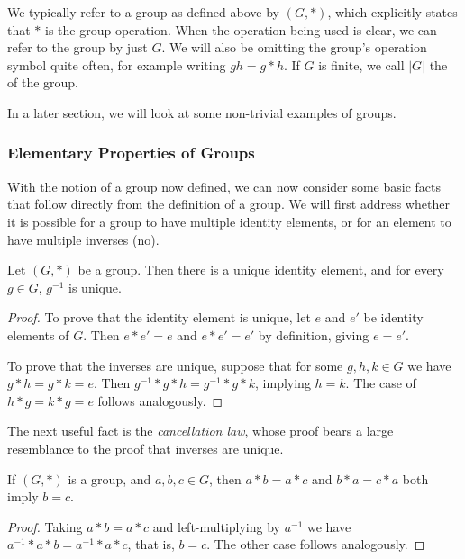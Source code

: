 \documentclass[a4paper]{scrartcl}
\begin{document}
We typically refer to a group as defined above by $(G, *)$, which explicitly states that $*$ is the group operation. When the operation being used is clear, we can refer to the group by just $G$. We will also be omitting the group's operation symbol quite often, for example writing $gh = g * h$. If $G$ is finite, we call $|G|$ the  of the group.

In a later section, we will look at some non-trivial examples of groups.

\subsubsection{Elementary Properties of Groups}

With the notion of a group now defined, we can now consider some basic facts that follow directly from the definition of a group. We will first address whether it is possible for a group to have multiple identity elements, or for an element to have multiple inverses (no).

\begin{proposition}
	Let $(G, *)$ be a group. Then there is a unique identity element, and for every $g \in G$, $g^{-1}$ is unique.
\end{proposition}
\begin{proof}
	To prove that the identity element is unique, let $e$ and $e'$ be identity elements of $G$. Then $e* e' = e$ and $e* e' = e'$ by definition, giving $e = e'$. 
	
	To prove that the inverses are unique, suppose that for some $g, h, k \in G$ we have $g* h = g *k = e$. Then $g^{-1}* g *h = g^{-1} *g * k$, implying $h = k$. The case of $h * g = k * g = e$ follows analogously.
\end{proof}

The next useful fact is the \emph{cancellation law}, whose proof bears a large resemblance to the proof that inverses are unique.

\begin{proposition}
	If $(G, *)$ is a group, and $a, b, c \in G$, then $a*b = a*c$ and $b*a = c*a$ both imply $b = c$.
\end{proposition}
\begin{proof}
	Taking $a * b = a * c$ and left-multiplying by $a^{-1}$ we have $a^{-1} * a * b = a^{-1} * a * c$, that is, $b = c$. The other case follows analogously.
\end{proof}
\end{document}
